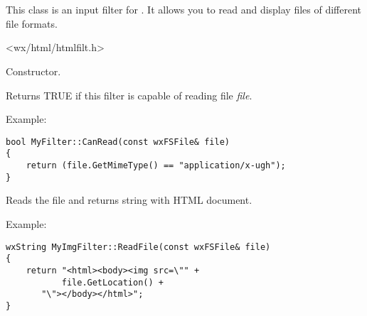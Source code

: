 %
%

\section{}\label{wxhtmlfilter}

This class is an input filter for .
It allows you to read and display files of different file formats.




<wx/html/htmlfilt.h>





\label{wxhtmlfilterwxhtmlfilter}


Constructor.

\label{wxhtmlfiltercanread}


Returns TRUE if this filter is capable of reading file {\it file}.

Example:

\begin{verbatim}
bool MyFilter::CanRead(const wxFSFile& file)
{
    return (file.GetMimeType() == "application/x-ugh");
}
\end{verbatim}

\label{wxhtmlfilterreadfile}


Reads the file and returns string with HTML document.

Example:

\begin{verbatim}
wxString MyImgFilter::ReadFile(const wxFSFile& file)
{
    return "<html><body><img src=\"" +
           file.GetLocation() +
	   "\"></body></html>";
}
\end{verbatim}

